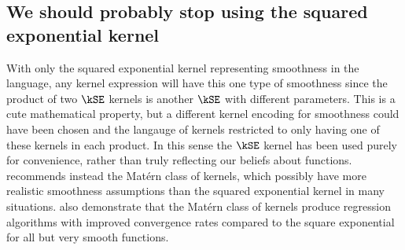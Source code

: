 \subsection{We should probably stop using the squared exponential kernel}

With only the squared exponential kernel representing smoothness in the language, any kernel expression will have this one type of smoothness since the product of two $\kSE$ kernels is another $\kSE$ with different parameters.
This is a cute mathematical property, but a different kernel encoding for smoothness could have been chosen and the langauge of kernels restricted to only having one of these kernels in each product.
In this sense the $\kSE$ kernel has been used purely for convenience, rather than truly reflecting our beliefs about functions.
\citet{Stein1999-ps} recommends instead the Mat\'ern class of kernels, which possibly have more realistic smoothness assumptions than the squared exponential kernel in many situations.
\citet{Van_der_Vaart2011-wo} also demonstrate that the Mat\'ern class of kernels produce regression algorithms with improved convergence rates compared to the square exponential for all but very smooth functions.



\outbpdocument{


}
